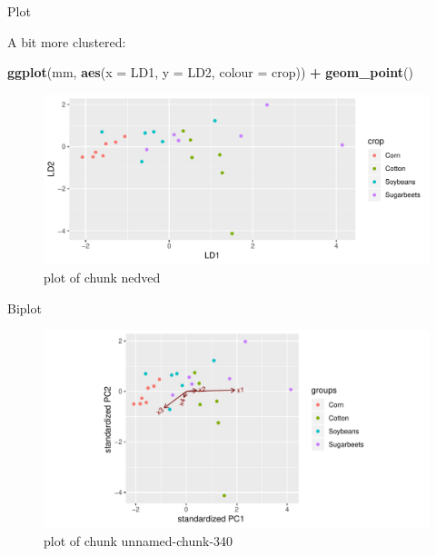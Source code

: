 \documentclass[ignorenonframetext,]{beamer}
\newenvironment{Shaded}{\begin{snugshade}}{\end{snugshade}}
\newcommand{\DataTypeTok}[1]{\textcolor[rgb]{0.13,0.29,0.53}{#1}}
\newcommand{\KeywordTok}[1]{\textcolor[rgb]{0.13,0.29,0.53}{\textbf{#1}}}
\newcommand{\NormalTok}[1]{#1}
\newcommand{\OperatorTok}[1]{\textcolor[rgb]{0.81,0.36,0.00}{\textbf{#1}}}
\newcommand{\StringTok}[1]{\textcolor[rgb]{0.31,0.60,0.02}{#1}}
\begin{document}
\begin{frame}[fragile]{Plot}
\protect\hypertarget{plot}{}

A bit more clustered:

\begin{Shaded}
\begin{Highlighting}[]
\KeywordTok{ggplot}\NormalTok{(mm, }\KeywordTok{aes}\NormalTok{(}\DataTypeTok{x =}\NormalTok{ LD1, }\DataTypeTok{y =}\NormalTok{ LD2, }\DataTypeTok{colour =}\NormalTok{ crop)) }\OperatorTok{+}
\StringTok{  }\KeywordTok{geom_point}\NormalTok{()}
\end{Highlighting}
\end{Shaded}

\begin{figure}
\centering
\includegraphics{figure/nedved-1.pdf}
\caption{plot of chunk nedved}
\end{figure}

\end{frame}

\begin{frame}[fragile]{Biplot}
\protect\hypertarget{biplot-2}{}

\begin{Shaded}
\end{Shaded}

\begin{figure}
\centering
\includegraphics{figure/unnamed-chunk-340-1.pdf}
\caption{plot of chunk unnamed-chunk-340}
\end{figure}

\end{frame}
\end{document}
